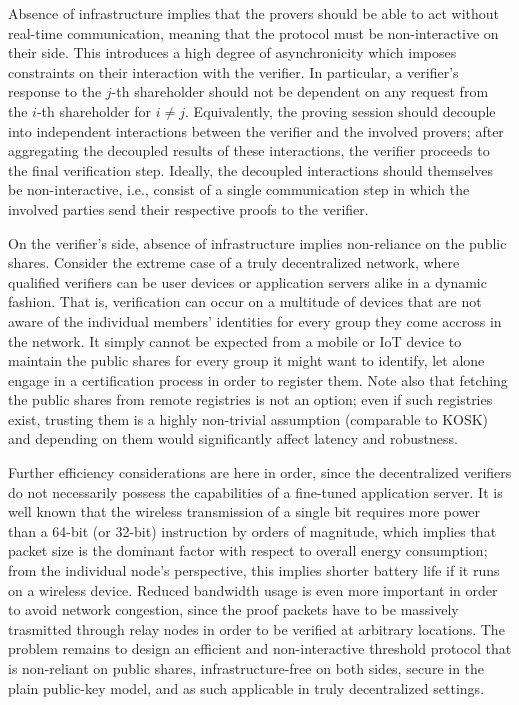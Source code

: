 \documentclass{iacrtrans}
\begin{document}
Absence of infrastructure implies that
the provers should be able to
act without real-time communication,
meaning that the protocol must be
non-interactive on their side.
This introduces a high degree of asynchronicity
which imposes constraints on their interaction
with the verifier.
In particular, a verifier's response
to the $j$-th shareholder should not be dependent
on any request from the $i$-th shareholder for $i \neq j$.
Equivalently, the proving session should decouple into
independent interactions between the verifier
and the involved provers; after aggregating
the decoupled results of these interactions, the verifier
proceeds to the final verification step.
Ideally, the decoupled interactions should themselves be
non-interactive, i.e., consist of a single communication
step in which the involved parties send their respective
proofs to the verifier.

On the verifier's side, absence of infrastructure
implies non-reliance on the public shares.
Consider the extreme case of a
truly decentralized network,
where qualified verifiers can be user devices
or application servers alike in a dynamic fashion.
That is, verification can occur
on a multitude of devices that are not aware
of the individual members' identities for every group
they come accross in the network.
It simply cannot be expected from a mobile or IoT device
to maintain the public shares for every group
it might want to identify,
let alone engage in a certification process
in order to register them.
Note also that fetching the public shares
from remote registries is not an option;
even if such registries exist,
trusting them is a highly non-trivial assumption
(comparable to KOSK)
and depending on them would significantly affect
latency and robustness.

Further efficiency considerations are here in order,
since the decentralized verifiers do not necessarily possess
the capabilities of a fine-tuned application server.
It is well known that the wireless transmission
of a single bit requires more power
than a 64-bit (or 32-bit) instruction by orders of magnitude,
which implies that packet size is
the dominant factor with respect to overall energy consumption;
from the individual node's perspective,
this implies shorter battery life
if it runs on a wireless device.
Reduced bandwidth usage is even more important
in order to avoid network congestion,
since the proof packets have to be massively trasmitted
through relay nodes
in order to be verified at arbitrary locations.
The problem remains to
design an efficient and non-interactive threshold protocol
that is non-reliant on public shares, infrastructure-free
on both sides, secure in the plain public-key model,
and as such applicable in truly decentralized settings.
\end{document}

